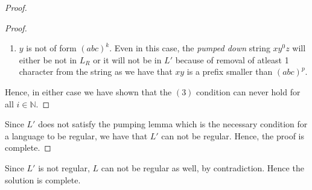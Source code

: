 \begin{soln}
\begin{proof}
\begin{proof}
\begin{enumerate}
    \item $y$ is not of form $(abc)^k$. Even in this case, the \emph{pumped down} string $x y^0 z$ will either be not in $L_R$ or it will not be in $L'$ because of removal of atleast 1 character from the string as we have that $xy$ is a prefix smaller than $(abc)^p$.
\end{enumerate}
Hence, in either case we have shown that the $(3)$ condition can never hold for all $i \in \mathbb{N}$.
\end{proof}
Since $L'$ does not satisfy the pumping lemma which is the necessary condition for a language to be regular, we have that $L'$ can not be regular. Hence, the proof is complete.
\end{proof}
Since $L'$ is not regular, $L$ can not be regular as well, by contradiction. Hence the solution is complete.
\end{soln}

